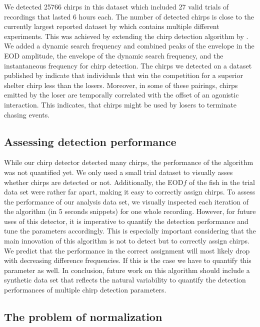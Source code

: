 
We detected 25766 chirps in this dataset which included 27 valid trials of recordings that lasted 6 hours each. The number of detected chirps is close to the currently largest reported dataset by \textcite{obotiWhyBrownGhost2022} which contains multiple different experiments. This was achieved by extending the chirp detection algorithm by \textcite{henningerTrackingActivityPatterns2020}. We added a dynamic search frequency and combined peaks of the envelope in the EOD amplitude, the envelope of the dynamic search frequency, and the instantaneous frequency for chirp detection. The chirps we detected on a dataset published by \textcite{raabElectrocommunicationSignalsIndicate2021} indicate that individuals that win the competition for a superior shelter chirp less than the losers. Moreover, in some of these pairings, chirps emitted by the loser are temporally correlated with the offset of an agonistic interaction. This indicates, that chirps might be used by losers to terminate chasing events.

\subsection{Assessing detection performance}

While our chirp detector detected many chirps, the performance of the algorithm was not quantified yet. We only used a small trial dataset to visually asses whether chirps are detected or not. Additionally, the EOD$f$ of the fish in the trial data set were rather far apart, making it easy to correctly assign chirps. To assess the performance of our analysis data set, we visually inspected each iteration of the algorithm (in 5 seconds snippets) for one whole recording. However, for future uses of this detector, it is imperative to quantify the detection performance and tune the parameters accordingly. This is especially important considering that the main innovation of this algorithm is not to detect but to correctly assign chirps. We predict that the performance in the correct assignment will most likely drop with decreasing difference frequencies. If this is the case we have to quantify this parameter as well. In conclusion, future work on this algorithm should include a synthetic data set that reflects the natural variability to quantify the detection performances of multiple chirp detection parameters.

\subsection{The problem of normalization}

